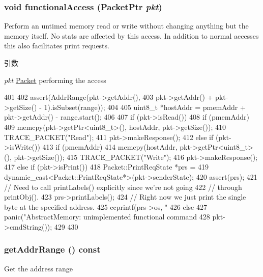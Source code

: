 \hypertarget{classAbstractMemory_ace845b5316308e12fd958fa5df09a8e8}{
\subsubsection[{functionalAccess}]{\setlength{\rightskip}{0pt plus 5cm}void functionalAccess ({\bf PacketPtr} {\em pkt})}}
\label{classAbstractMemory_ace845b5316308e12fd958fa5df09a8e8}
Perform an untimed memory read or write without changing anything but the memory itself. No stats are affected by this access. In addition to normal accesses this also facilitates print requests.


\begin{DoxyParams}{引数}
\item[{\em pkt}]\hyperlink{classPacket}{Packet} performing the access \end{DoxyParams}



\begin{DoxyCode}
401 {
402     assert(AddrRange(pkt->getAddr(),
403                      pkt->getAddr() + pkt->getSize() - 1).isSubset(range));
404 
405     uint8_t *hostAddr = pmemAddr + pkt->getAddr() - range.start();
406 
407     if (pkt->isRead()) {
408         if (pmemAddr)
409             memcpy(pkt->getPtr<uint8_t>(), hostAddr, pkt->getSize());
410         TRACE_PACKET("Read");
411         pkt->makeResponse();
412     } else if (pkt->isWrite()) {
413         if (pmemAddr)
414             memcpy(hostAddr, pkt->getPtr<uint8_t>(), pkt->getSize());
415         TRACE_PACKET("Write");
416         pkt->makeResponse();
417     } else if (pkt->isPrint()) {
418         Packet::PrintReqState *prs =
419             dynamic_cast<Packet::PrintReqState*>(pkt->senderState);
420         assert(prs);
421         // Need to call printLabels() explicitly since we're not going
422         // through printObj().
423         prs->printLabels();
424         // Right now we just print the single byte at the specified address.
425         ccprintf(prs->os, "%
426     } else {
427         panic("AbstractMemory: unimplemented functional command %
428               pkt->cmdString());
429     }
430 }
\end{DoxyCode}
\hypertarget{classAbstractMemory_aa3df62a6c92a30a0ab9247f8ec9e6e7a}{
\subsubsection[{getAddrRange}]{ getAddrRange () const}}
\label{classAbstractMemory_aa3df62a6c92a30a0ab9247f8ec9e6e7a}
Get the address range


